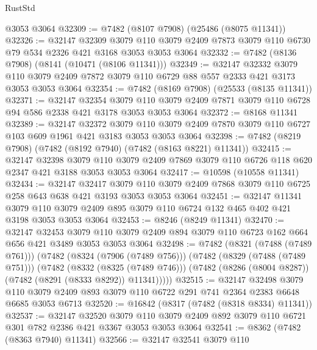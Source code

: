 \begin{lexlean}{RustStd}
\begin{coremodule}
    @3053
    @3064
@32309 := @7482 (@8107 @7908) (@25486 (@8075 @11341))
@32326 := @32147
    @32309
    @3079
    @110
    @3079
    @2409
    @7873
    @3079
    @110
    @6730
    @79
    @534
    @2326
    @421
    @3168
    @3053
    @3053
    @3064
@32332 := @7482 (@8136 @7908) (@8141 (@10471 (@8106 @11341)))
@32349 := @32147
    @32332
    @3079
    @110
    @3079
    @2409
    @7872
    @3079
    @110
    @6729
    @88
    @557
    @2333
    @421
    @3173
    @3053
    @3053
    @3064
@32354 := @7482 (@8169 @7908) (@25533 (@8135 @11341))
@32371 := @32147
    @32354
    @3079
    @110
    @3079
    @2409
    @7871
    @3079
    @110
    @6728
    @94
    @586
    @2338
    @421
    @3178
    @3053
    @3053
    @3064
@32372 := @8168 @11341
@32389 := @32147
    @32372
    @3079
    @110
    @3079
    @2409
    @7870
    @3079
    @110
    @6727
    @103
    @609
    @1961
    @421
    @3183
    @3053
    @3053
    @3064
@32398 := @7482 (@8219 @7908) (@7482 (@8192 @7940) (@7482 (@8163 @8221) @11341))
@32415 := @32147
    @32398
    @3079
    @110
    @3079
    @2409
    @7869
    @3079
    @110
    @6726
    @118
    @620
    @2347
    @421
    @3188
    @3053
    @3053
    @3064
@32417 := @10598 (@10558 @11341)
@32434 := @32147
    @32417
    @3079
    @110
    @3079
    @2409
    @7868
    @3079
    @110
    @6725
    @258
    @643
    @638
    @421
    @3193
    @3053
    @3053
    @3064
@32451 := @32147
    @11341
    @3079
    @110
    @3079
    @2409
    @895
    @3079
    @110
    @6724
    @132
    @465
    @402
    @421
    @3198
    @3053
    @3053
    @3064
@32453 := @8246 (@8249 @11341)
@32470 := @32147
    @32453
    @3079
    @110
    @3079
    @2409
    @894
    @3079
    @110
    @6723
    @162
    @664
    @656
    @421
    @3489
    @3053
    @3053
    @3064
@32498 := @7482
    (@8321 (@7488 (@7489 @761)))
    (@7482
      (@8324 (@7906 (@7489 @756)))
      (@7482
        (@8329 (@7488 (@7489 @751)))
        (@7482
          (@8332 (@8325 (@7489 @746)))
          (@7482 (@8286 (@8004 @8287)) (@7482 (@8291 (@8333 @8292)) @11341)))))
@32515 := @32147
    @32498
    @3079
    @110
    @3079
    @2409
    @893
    @3079
    @110
    @6722
    @291
    @741
    @2364
    @2383
    @6648
    @6685
    @3053
    @6713
@32520 := @16842 (@8317 (@7482 (@8318 @8334) @11341))
@32537 := @32147
    @32520
    @3079
    @110
    @3079
    @2409
    @892
    @3079
    @110
    @6721
    @301
    @782
    @2386
    @421
    @3367
    @3053
    @3053
    @3064
@32541 := @8362 (@7482 (@8363 @7940) @11341)
@32566 := @32147
    @32541
    @3079
    @110

\end{coremodule}
\end{lexlean}
